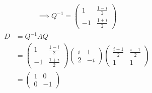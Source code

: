 \begin{enumerate}
\begin{enumerate}[(i)]
\begin{gather}
\implies Q^{-1} = 
\begin{pmatrix}
1 & \frac{1-i}{2}\\
-1 & \frac{1+i}{2}
\end{pmatrix}
\end{gather}
\begin{align}
D &= Q^{-1}AQ\\
&= \begin{pmatrix}
1 & \frac{1-i}{2}\\
-1 & \frac{1+i}{2}
\end{pmatrix}
\begin{pmatrix}
i & 1\\
2 & -i
\end{pmatrix}
\begin{pmatrix}
\frac{i+1}{2} & \frac{i-1}{2}\\
1 & 1
\end{pmatrix}\\
&= \begin{pmatrix}
1 & 0 \\
0 & -1
\end{pmatrix}
\end{align}
\end{enumerate}
\end{enumerate}
